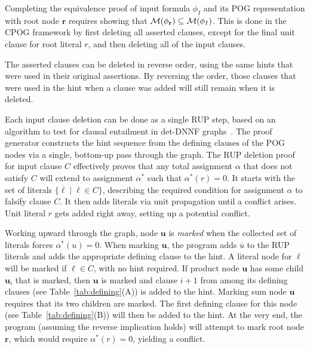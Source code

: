 \documentclass[twoside,11pt]{article}
\newcommand{\obar}[1]{\overline{#1}}
\newcommand{\lit}{\ell}
\newcommand{\imply}{\Rightarrow}
\newcommand{\extend}[1]{#1^{*}}
\newcommand{\assign}{\alpha}
\newcommand{\eassign}{\extend{\alpha}}
\newcommand{\modelset}{{\cal M}}
\newcommand{\inputformula}{\phi_I}
\newcommand{\makenode}[1]{\mathbf{#1}}
\newcommand{\nodeu}{\makenode{u}}
\newcommand{\noder}{\makenode{r}}
\begin{document}
Completing the equivalence proof of input formula $\inputformula$ and its POG
representation with root node $\noder$ requires showing that
$\modelset(\phi_\noder) \subseteq \modelset(\inputformula)$.  This is done in the
CPOG framework by first deleting all asserted clauses, except for the
final unit clause for root literal $r$, and then deleting all of the
input clauses.

The asserted clauses can be deleted in reverse order, using the same
hints that were used in their original assertions.  By reversing the
order, those clauses that were used in the hint when a clause was
added will still remain when it is deleted.

Each input clause deletion can be done as a single RUP step, based
on an algorithm to test for clausal entailment in det-DNNF graphs~\cite{capelli:sat:2019,darwiche:jair:2002}.  The
proof generator constructs the hint sequence from the defining
clauses of the POG nodes via a single, bottom-up pass through the
graph.  The RUP deletion proof for input clause $C$ effectively proves that any
total assignment $\assign$ that does not
satisfy $C$ will extend to assignment $\eassign$ such that
$\eassign(r) = 0$.  It starts with the set of literals
$\{ \obar{\lit} \mid \lit \in C\}$, describing the required condition for
assignment $\assign$ to falsify clause $C$.
It then
adds literals via unit propagation until a
conflict arises.    Unit literal $r$ gets
added right away, setting up a potential conflict.

Working upward through the graph, node $\nodeu$ is \emph{marked} when
the collected set of literals forces $\eassign(u) = 0$.  When marking $\nodeu$, the
program adds $\obar{u}$ to the RUP literals and adds the appropriate
defining clause to the hint.  A literal node for
$\lit$ will be marked if $\lit \in C$, with no hint required.  If
product node $\nodeu$ has some child $\nodeu_i$ that is marked, then
$\nodeu$ is marked and clause $i+1$ from among its defining clauses (see Table~\ref{tab:defining}(A)) is
added to the hint.  Marking sum node $\nodeu$ requires that its two children are marked.
The first defining
clause for this node (see Table~\ref{tab:defining}(B)) will then be added to the hint.  At the very end, the program
(assuming the reverse implication holds) will attempt to mark root
node $\noder$, which would require $\eassign(r) = 0$, yielding a
conflict.
\end{document}
